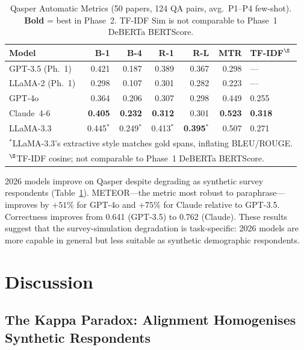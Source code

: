 \documentclass[12pt,a4paper]{article}
\begin{document}
\begin{table}[ht]
\caption{Qasper Automatic Metrics (50 papers, 124 QA pairs,
  avg.\ P1--P4 few-shot). \textbf{Bold} = best in Phase~2.
  TF-IDF Sim is not comparable to Phase~1 DeBERTa BERTScore.}
\label{tab:qasper-auto}
\centering\small
\setlength{\tabcolsep}{3.5pt}
\begin{tabular}{lrrrrrl}
\toprule
\textbf{Model} & \textbf{B-1} & \textbf{B-4}
  & \textbf{R-1} & \textbf{R-L} & \textbf{MTR}
  & \textbf{TF-IDF$^{\S}$} \\
\midrule
GPT-3.5 (Ph.~1) & 0.421 & 0.187 & 0.389 & 0.367 & 0.298 & --- \\
LLaMA-2 (Ph.~1) & 0.298 & 0.107 & 0.301 & 0.282 & 0.223 & --- \\
\midrule
GPT-4o          & 0.364 & 0.206 & 0.307 & 0.298 & 0.449 & 0.255 \\
Claude~4-6      & \textbf{0.405} & \textbf{0.232} & \textbf{0.312} & 0.301 & \textbf{0.523} & \textbf{0.318} \\
LLaMA-3.3       & 0.445$^{*}$ & 0.249$^{*}$ & 0.413$^{*}$ & \textbf{0.395}$^{*}$ & 0.507 & 0.271 \\
\bottomrule
\multicolumn{7}{l}{\footnotesize $^{*}$LLaMA-3.3's extractive style matches gold spans,
  inflating BLEU/ROUGE.}\\
\multicolumn{7}{l}{\footnotesize $^{\S}$TF-IDF cosine; not comparable to Phase~1
  DeBERTa BERTScore.}\\
\end{tabular}
\end{table}

2026 models improve on Qasper despite degrading as synthetic survey
respondents (Table~\ref{tab:qasper-auto}).
METEOR---the metric most robust to paraphrase---improves by $+51\%$
for GPT-4o and $+75\%$ for Claude relative to GPT-3.5.
Correctness improves from 0.641 (GPT-3.5) to 0.762 (Claude).
These results suggest that the survey-simulation degradation is
task-specific: 2026 models are more capable in general but less
suitable as synthetic demographic respondents.

\section{Discussion}
\label{sec:discussion}

\subsection{The Kappa Paradox: Alignment Homogenises Synthetic Respondents}
\label{sec:disc:kappa}
\end{document}
